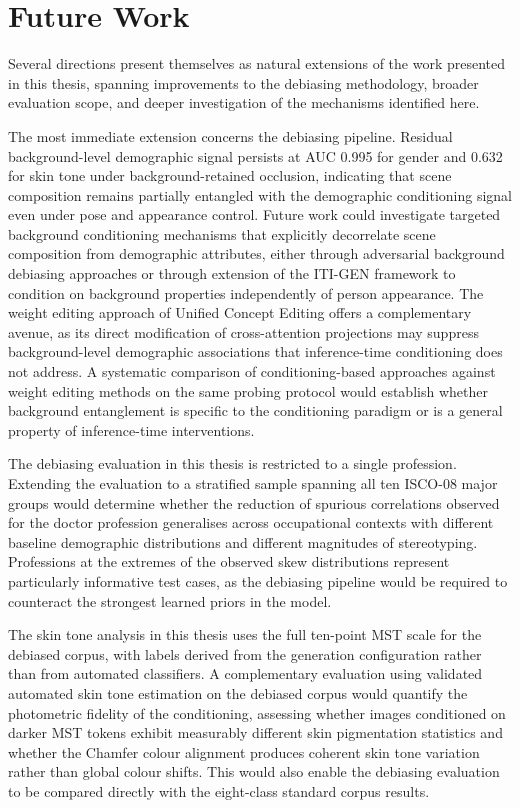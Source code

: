 \section{Future Work}
\label{sec:future_work}

Several directions present themselves as natural extensions of the work presented in this
thesis, spanning improvements to the debiasing methodology, broader evaluation scope, and
deeper investigation of the mechanisms identified here.

The most immediate extension concerns the debiasing pipeline. Residual background-level
demographic signal persists at AUC 0.995 for gender and 0.632 for skin tone under
background-retained occlusion, indicating that scene composition remains partially
entangled with the demographic conditioning signal even under pose and appearance control.
Future work could investigate targeted background conditioning mechanisms that explicitly
decorrelate scene composition from demographic attributes, either through adversarial
background debiasing approaches or through extension of the ITI-GEN framework to condition
on background properties independently of person appearance. The weight editing approach
of Unified Concept Editing \cite{Gandikota_2024_UCE} offers a complementary avenue, as
its direct modification of cross-attention projections may suppress background-level
demographic associations that inference-time conditioning does not address. A systematic
comparison of conditioning-based approaches against weight editing methods on the same
probing protocol would establish whether background entanglement is specific to the
conditioning paradigm or is a general property of inference-time interventions.

The debiasing evaluation in this thesis is restricted to a single profession. Extending
the evaluation to a stratified sample spanning all ten ISCO-08 major groups would
determine whether the reduction of spurious correlations observed for the doctor
profession generalises across occupational contexts with different baseline demographic
distributions and different magnitudes of stereotyping. Professions at the extremes of
the observed skew distributions represent particularly informative test cases, as the
debiasing pipeline would be required to counteract the strongest learned priors in the
model.

The skin tone analysis in this thesis uses the full ten-point MST scale for the debiased
corpus, with labels derived from the generation configuration rather than from automated
classifiers. A complementary evaluation using validated automated skin tone estimation on
the debiased corpus would quantify the photometric fidelity of the conditioning,
assessing whether images conditioned on darker MST tokens exhibit measurably different
skin pigmentation statistics and whether the Chamfer colour alignment produces coherent
skin tone variation rather than global colour shifts. This would also enable the
debiasing evaluation to be compared directly with the eight-class standard corpus results.

